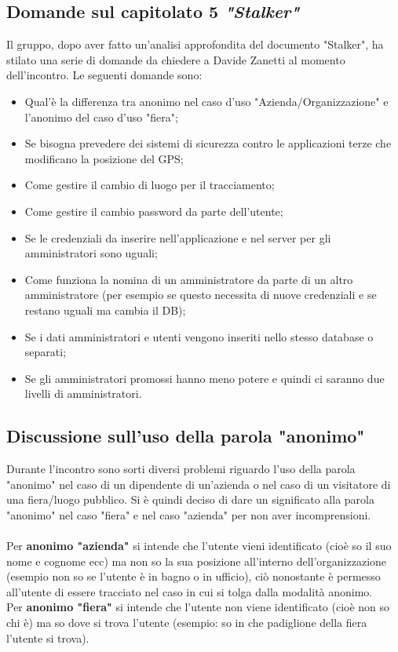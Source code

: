 \subsection{Domande sul capitolato 5 \textit{"Stalker"}}
Il gruppo, dopo aver fatto un'analisi approfondita del documento "Stalker", ha stilato una serie di domande da chiedere a Davide Zanetti al momento dell'incontro.
Le seguenti domande sono:
\begin{itemize}
	\item Qual'è la differenza tra anonimo nel caso d’uso "Azienda/Organizzazione" e l’anonimo del caso d’uso "fiera";
	\item Se bisogna prevedere dei sistemi di sicurezza contro le applicazioni terze che modificano la posizione del GPS;
	\item Come gestire il cambio di luogo per il tracciamento;
	\item Come gestire il cambio password da parte dell’utente;
	\item Se le credenziali da inserire nell’applicazione e nel server per gli amministratori sono uguali;
	\item Come funziona la nomina di un amministratore da parte di un altro amministratore (per esempio se questo necessita di nuove credenziali e se restano uguali ma cambia il DB);
	\item Se i dati amministratori e utenti vengono inseriti nello stesso database o separati;
	\item Se gli amministratori promossi hanno meno potere e quindi ci saranno due livelli di amministratori.
\end{itemize}

\subsection{Discussione sull'uso della parola "anonimo"}
Durante l'incontro sono sorti diversi problemi riguardo l'uso della parola "anonimo" nel caso di un dipendente di un'azienda o nel caso di un visitatore di una fiera/luogo pubblico.
Si è quindi deciso di dare un significato alla parola "anonimo" nel caso "fiera" e nel caso "azienda" per non aver incomprensioni.
\\\\Per \textbf{anonimo "azienda" }si intende che l’utente vieni identificato (cioè so il suo nome e cognome ecc) ma non so la sua posizione all’interno dell'organizzazione (esempio non so se l’utente è in bagno o in ufficio), ciò nonostante è permesso all’utente di essere tracciato nel caso in cui si tolga dalla modalità anonimo.
\\Per \textbf{anonimo "fiera"} si intende che l’utente non viene identificato (cioè non so chi è) ma so dove si trova l’utente (esempio: so in che padiglione della fiera l’utente si trova).


\clearpage
